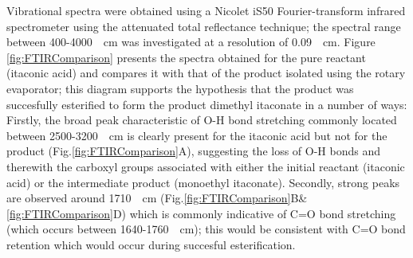 Vibrational spectra were obtained using a Nicolet iS50 Fourier-transform
 infrared spectrometer using the attenuated total reflectance technique;
 the spectral range between 400-4000~\unit{\per\centi\metre} was
 investigated at a resolution of 0.09~\unit{\per\centi\metre}.
Figure \ref{fig:FTIRComparison} presents the spectra obtained for the pure
 reactant (itaconic acid) and compares it with that of the product
 isolated using the rotary evaporator; this diagram supports the hypothesis
 that the product was succesfully esterified to form the product dimethyl
 itaconate in a number of ways:
Firstly, the broad peak characteristic of O-H bond stretching commonly
 located between 2500-3200~\unit{\per\centi\metre} is clearly
 present for the itaconic acid but not for the product
 (Fig.\ref{fig:FTIRComparison}A), suggesting the loss of O-H bonds
 and therewith the carboxyl groups associated with either the initial
 reactant (itaconic acid) or the intermediate product (monoethyl itaconate).
Secondly, strong peaks are observed around 1710~\unit{\per\centi\metre}
 (Fig.\ref{fig:FTIRComparison}B\&\ref{fig:FTIRComparison}D) which
 is commonly indicative of C=O bond stretching (which occurs between 
 1640-1760~\unit{\per\centi\metre}); this would be consistent with C=O
 bond retention which would occur during succesful esterification.

